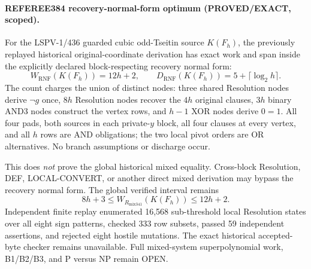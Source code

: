 \paragraph{REFEREE384 recovery-normal-form optimum (PROVED/EXACT, scoped).}
For the LSPV-1/436 guarded cubic odd-Tseitin source $K(F_h)$, the previously
replayed historical original-coordinate derivation has exact work and span
inside the explicitly declared block-respecting recovery normal form:
\[
 W_{\mathrm{RNF}}(K(F_h))=12h+2,
 \qquad
 D_{\mathrm{RNF}}(K(F_h))=5+\lceil\log_2 h\rceil.
\]
The count charges the union of distinct nodes: three shared Resolution nodes
derive $\neg g$ once, $8h$ Resolution nodes recover the $4h$ original
clauses, $3h$ binary AND3 nodes construct the vertex rows, and $h-1$ XOR
nodes derive $0=1$.  All four pads, both sources in each private-$y$ block,
all four clauses at every vertex, and all $h$ rows are AND obligations; the
two local pivot orders are OR alternatives.  No branch assumptions or
discharge occur.

This does \emph{not} prove the global historical mixed equality.  Cross-block
Resolution, DEF, LOCAL-CONVERT, or another direct mixed derivation may bypass
the recovery normal form.  The global verified interval remains
\[
 8h+3\le W_{R_{\mathrm{mix341}}}(K(F_h))\le12h+2.
\]
Independent finite replay enumerated 16,568 sub-threshold local Resolution
states over all eight sign patterns, checked 333 row subsets, passed 59
independent assertions, and rejected eight hostile mutations.  The exact
historical accepted-byte checker remains unavailable.  Full mixed-system
superpolynomial work, B1/B2/B3, and P versus NP remain OPEN.
